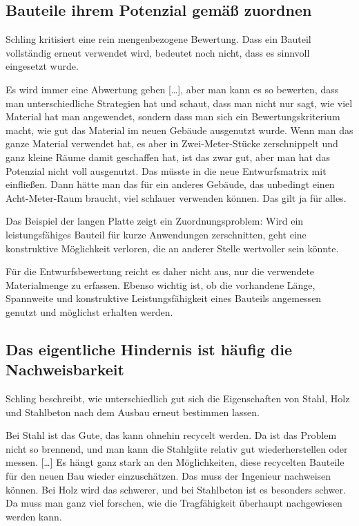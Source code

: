\subsection{Bauteile ihrem Potenzial gemäß zuordnen}

Schling kritisiert eine rein mengenbezogene Bewertung. Dass ein Bauteil vollständig erneut verwendet wird, bedeutet noch nicht, dass es sinnvoll eingesetzt wurde.

\begin{Blockquote}
Es wird immer eine Abwertung geben […], aber man kann es so bewerten, dass man unterschiedliche Strategien hat und schaut, dass man nicht nur sagt, wie viel Material hat man angewendet, sondern dass man sich ein Bewertungskriterium macht, wie gut das Material im neuen Gebäude ausgenutzt wurde. Wenn man das ganze Material verwendet hat, es aber in Zwei-Meter-Stücke zerschnippelt und ganz kleine Räume damit geschaffen hat, ist das zwar gut, aber man hat das Potenzial nicht voll ausgenutzt. Das müsste in die neue Entwurfsmatrix mit einfließen. Dann hätte man das für ein anderes Gebäude, das unbedingt einen Acht-Meter-Raum braucht, viel schlauer verwenden können. Das gilt ja für alles.
\end{Blockquote}

Das Beispiel der langen Platte zeigt ein Zuordnungsproblem: Wird ein leistungsfähiges Bauteil für kurze Anwendungen zerschnitten, geht eine konstruktive Möglichkeit verloren, die an anderer Stelle wertvoller sein könnte.

Für die Entwurfsbewertung reicht es daher nicht aus, nur die verwendete Materialmenge zu erfassen. Ebenso wichtig ist, ob die vorhandene Länge, Spannweite und konstruktive Leistungsfähigkeit eines Bauteils angemessen genutzt und möglichst erhalten werden.

\subsection{Das eigentliche Hindernis ist häufig die Nachweisbarkeit}

Schling beschreibt, wie unterschiedlich gut sich die Eigenschaften von Stahl, Holz und Stahlbeton nach dem Ausbau erneut bestimmen lassen.

\begin{Blockquote}
Bei Stahl ist das Gute, das kann ohnehin recycelt werden. Da ist das Problem nicht so brennend, und man kann die Stahlgüte relativ gut wiederherstellen oder messen. […] Es hängt ganz stark an den Möglichkeiten, diese recycelten Bauteile für den neuen Bau wieder einzuschätzen. Das muss der Ingenieur nachweisen können. Bei Holz wird das schwerer, und bei Stahlbeton ist es besonders schwer. Da muss man ganz viel forschen, wie die Tragfähigkeit überhaupt nachgewiesen werden kann.
\end{Blockquote}

